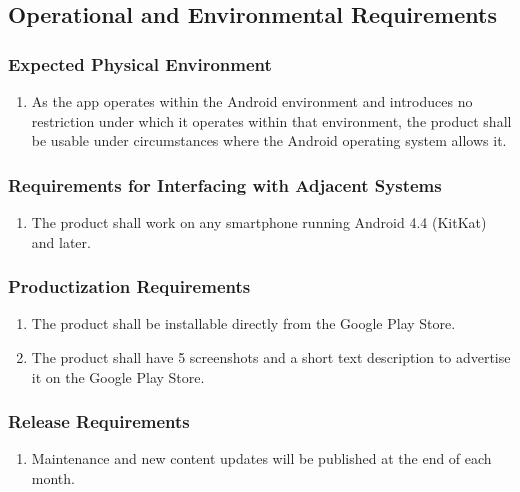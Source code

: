 \documentclass[]{article}
\begin{document}
\subsection{Operational and Environmental Requirements}
\label{sub:operational_and_environmental_requirements}

\subsubsection{Expected Physical Environment}
\label{ssub:expected_physical_environment}
\begin{enumerate}[{OE}1. ]
	\item As the app operates within the Android environment and introduces no restriction under which it operates within that environment, the product shall be usable under circumstances where the Android operating system allows it.
	\holdEnum
\end{enumerate}

\subsubsection{Requirements for Interfacing with Adjacent Systems}
\label{ssub:requirements_for_interfacing_with_adjacent_systems}
\begin{enumerate}[{OE}1. ]
	\resumeEnum
	\item The product shall work on any smartphone running Android 4.4 (KitKat) and later.
	\holdEnum
\end{enumerate}

\subsubsection{Productization Requirements}
\label{ssub:productization_requirements}
\begin{enumerate}[{OE}1. ]
	\resumeEnum
	\item The product shall be installable directly from the Google Play Store.
	\item The product shall have 5 screenshots and a short text description to advertise it on the Google Play Store.
	\holdEnum
\end{enumerate}

\subsubsection{Release Requirements}
\label{ssub:release_requirements}
\begin{enumerate}[{OE}1. ]
	\resumeEnum
	\item Maintenance and new content updates will be published at the end of each month.
	\holdEnum
\end{enumerate}
\end{document}
